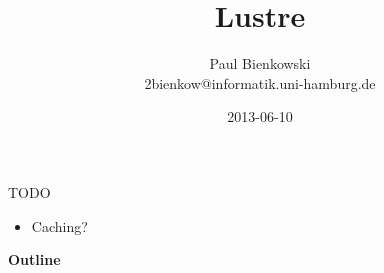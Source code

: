 \documentclass[compress,t,xcolor=dvipsnames]{beamer}
\title{Lustre}
\author{Paul Bienkowski \\[0.2em] \scriptsize 2bienkow@informatik.uni-hamburg.de}
\institute{Proseminar ``Ein-/Ausgabe - Stand der Wissenschaft''}
\date{2013-06-10}
\newif\iffinal
\begin{document}
\iffinal\else
\begin{frame}{TODO}
    \begin{itemize}
        \item Caching?
    \end{itemize}
\end{frame}
\fi

\begin{frame}
    \titlepage
\end{frame}

\begin{frame}{\textbf{Outline}}
    \tableofcontents
\end{frame}









\end{document}
